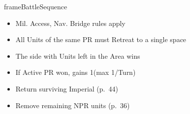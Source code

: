 \documentclass[10pt]{article}
\newlength{\fhBattleSequence} \setlength\fhBattleSequence{50\baselineskip}
\begin{document}
\begin{dynamiccontents*}{frameBattleSequence}
\begin{eubox}{\fhBattleSequence}
\begin{multicols}{2}
\begin{itemize}
\begin{itemize}
				\begin{itemize}
					\item Mil. Access, Nav. Bridge rules apply
					\item All Units of the same PR must Retreat to a single space
				\end{itemize}
			\end{itemize}
		\end{itemize}
		\begin{itemize}
			\item The side with Units left in the Area wins
			\item If Active PR won, gains 1\milpower (max 1/Turn)
			\item Return surviving Imperial \manpower (p.~44)
			\item Remove remaining NPR units (p.~36)
		\end{itemize}
	\end{multicols}
\end{eubox}\end{dynamiccontents*}
\end{document}
